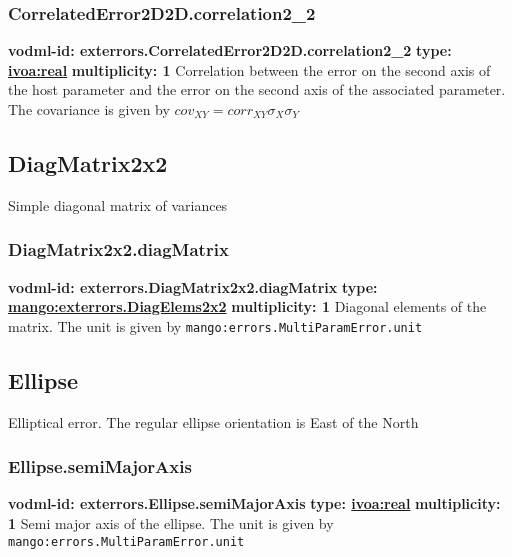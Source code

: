     \subsubsection{CorrelatedError2D2D.correlation2\_2}
      \textbf{vodml-id: exterrors.CorrelatedError2D2D.correlation2\_2} \newline
      \textbf{type: \hyperref[sect:ivoa]{ivoa:real}} \newline
      \textbf{multiplicity: 1} \newline 
      Correlation between the error on the second axis of the host parameter and the error on the second axis of the associated parameter. The covariance is given by $cov_{XY}=corr_{XY}\sigma_{X}\sigma_{Y}$

  \subsection{DiagMatrix2x2}
  \label{sect:exterrors.DiagMatrix2x2}
    Simple diagonal matrix of variances

    \subsubsection{DiagMatrix2x2.diagMatrix}
      \textbf{vodml-id: exterrors.DiagMatrix2x2.diagMatrix} \newline
      \textbf{type: \hyperref[sect:exterrors.DiagElems2x2]{mango:exterrors.DiagElems2x2}} \newline
      \textbf{multiplicity: 1} \newline 
      Diagonal elements of the matrix. The unit is given by \texttt{mango:errors.MultiParamError.unit}

  \subsection{Ellipse}
  \label{sect:exterrors.Ellipse}
    Elliptical error. The regular ellipse orientation is East of the North

    \subsubsection{Ellipse.semiMajorAxis}
      \textbf{vodml-id: exterrors.Ellipse.semiMajorAxis} \newline
      \textbf{type: \hyperref[sect:ivoa]{ivoa:real}} \newline
      \textbf{multiplicity: 1} \newline 
      Semi major axis of the ellipse. The unit is given by \texttt{mango:errors.MultiParamError.unit}

